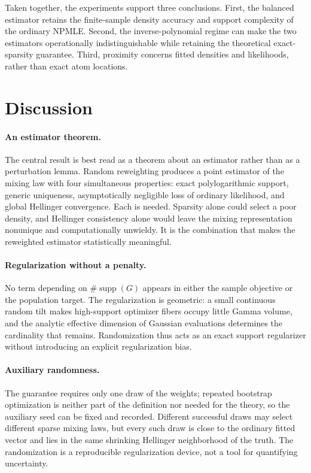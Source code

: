 \documentclass[11pt]{article}
\theoremstyle{definition}
\theoremstyle{remark}
\DeclareMathOperator{\supp}{supp}
\begin{document}
Taken together, the experiments support three conclusions.  First, the
balanced estimator retains the finite-sample density accuracy and support
complexity of the ordinary NPMLE.  Second, the inverse-polynomial regime can
make the two estimators operationally indistinguishable while retaining the
theoretical exact-sparsity guarantee.  Third, proximity concerns fitted
densities and likelihoods, rather than exact atom locations.

\FloatBarrier
\section{Discussion}\label{sec:discussion}

\paragraph{An estimator theorem.}
The central result is best read as a theorem about an estimator rather than
as a perturbation lemma.  Random reweighting produces a point estimator of
the mixing law with four simultaneous properties: exact polylogarithmic
support, generic uniqueness, asymptotically negligible loss of ordinary
likelihood, and global Hellinger convergence.  Each is needed.  Sparsity
alone could select a poor density, and Hellinger consistency alone would
leave the mixing representation nonunique and computationally unwieldy.  It
is the combination that makes the reweighted estimator statistically
meaningful.

\paragraph{Regularization without a penalty.}
No term depending on $\#\supp(G)$ appears in either the sample objective or
the population target.  The regularization is geometric: a small continuous
random tilt makes high-support optimizer fibers occupy little Gamma volume,
and the analytic effective dimension of Gaussian evaluations determines the
cardinality that remains.  Randomization thus acts as an exact support
regularizer without introducing an explicit regularization bias.

\paragraph{Auxiliary randomness.}
The guarantee requires only one draw of the weights; repeated bootstrap
optimization is neither part of the definition nor needed for the theory,
so the auxiliary seed can be fixed and recorded.  Different successful draws
may select different sparse mixing laws, but every such draw is close to the
ordinary fitted vector and lies in the same shrinking Hellinger neighborhood
of the truth.  The randomization is a reproducible regularization device,
not a tool for quantifying uncertainty.
\end{document}

